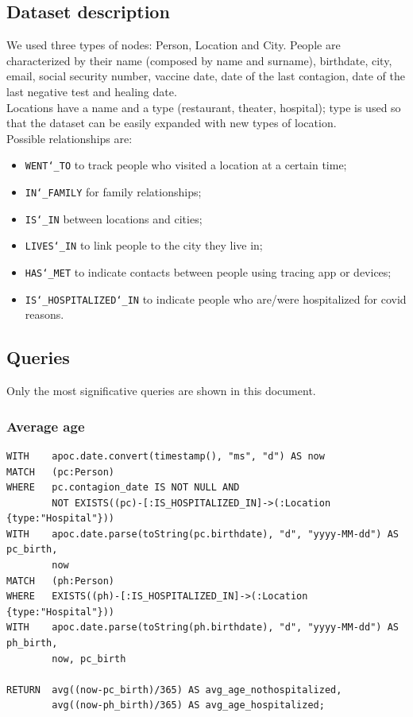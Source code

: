 \documentclass[12pt, a4paper]{article}
\begin{document}
\subsection{Dataset description}

We used three types of nodes: Person, Location and City. 
People are characterized by their name (composed by name and surname), 
birthdate, city, email, social security number, vaccine date, date of the last 
contagion, date of the last negative test and healing date. \\
Locations have a name and a type (restaurant, theater, hospital); 
type is used so that the dataset can be easily expanded with new types of 
location. \\
Possible relationships are: 
\begin{itemize}
    \item \texttt{WENT\char`_TO} to track people who visited a location at a 
        certain time;
	\item \texttt{IN\char`_FAMILY} for family relationships;
	\item \texttt{IS\char`_IN} between locations and cities;
	\item \texttt{LIVES\char`_IN} to link people to the city they live in;
    \item \texttt{HAS\char`_MET} to indicate contacts between people using 
        tracing app or devices;
    \item \texttt{IS\char`_HOSPITALIZED\char`_IN} to indicate people who 
        are/were hospitalized for covid reasons.
\end{itemize}

\subsection{Queries}

Only the most significative queries are shown in this document.

\subsubsection{Average age}

\begin{tcolorbox}[fontupper=\scriptsize]
    \begin{verbatim}
WITH    apoc.date.convert(timestamp(), "ms", "d") AS now
MATCH   (pc:Person)
WHERE   pc.contagion_date IS NOT NULL AND
        NOT EXISTS((pc)-[:IS_HOSPITALIZED_IN]->(:Location {type:"Hospital"}))
WITH    apoc.date.parse(toString(pc.birthdate), "d", "yyyy-MM-dd") AS pc_birth,
        now
MATCH   (ph:Person)
WHERE   EXISTS((ph)-[:IS_HOSPITALIZED_IN]->(:Location {type:"Hospital"}))
WITH    apoc.date.parse(toString(ph.birthdate), "d", "yyyy-MM-dd") AS ph_birth,
        now, pc_birth

RETURN  avg((now-pc_birth)/365) AS avg_age_nothospitalized, 
        avg((now-ph_birth)/365) AS avg_age_hospitalized;
    \end{verbatim}
\end{tcolorbox}
\end{document}

